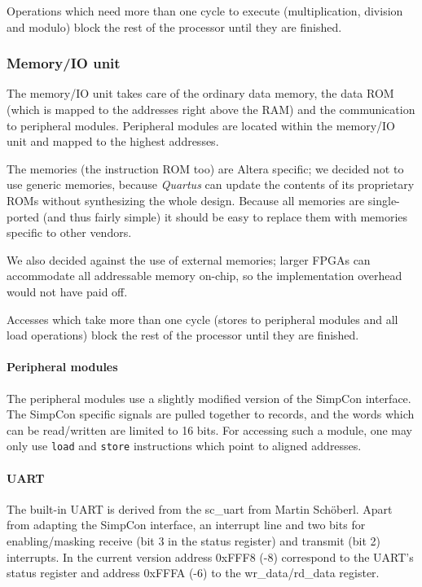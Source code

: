 \documentclass[10pt, twoside, a4paper]{article}
\begin{document}
  Operations which need more than one cycle to execute (multiplication,
  division and modulo) block the rest of the processor until they are
  finished.

  \subsubsection{Memory/IO unit}
  The memory/IO unit takes care of the ordinary data memory, the data
  ROM (which is mapped to the addresses right above the RAM) and the
  communication to peripheral modules. Peripheral modules are located
  within the memory/IO unit and mapped to the highest addresses.

  The memories (the instruction ROM too) are Altera specific; we
  decided not to use generic memories, because \textsl{Quartus} can update the
  contents of its proprietary ROMs without synthesizing the whole
  design. Because all memories are single-ported (and thus fairly
  simple) it should be easy to replace them with memories specific to
  other vendors.

  We also decided against the use of external memories; larger FPGAs
  can accommodate all addressable memory on-chip, so the implementation
  overhead would not have paid off.

  Accesses which take more than one cycle (stores to peripheral
  modules and all load operations) block the rest of the processor
  until they are finished.

  \paragraph{Peripheral modules}
  The peripheral modules use a slightly modified version of the SimpCon
  interface. The SimpCon specific signals are pulled together to
  records, and the words which can be read/written are limited to 16
  bits. For accessing such a module, one may only use \texttt{load}
  and \texttt{store} instructions which point to aligned addresses.

  \paragraph{UART}
  The built-in UART is derived from the sc\_uart from Martin
  Sch\"oberl.  Apart from adapting the SimpCon interface, an interrupt
  line and two bits for enabling/masking receive (bit 3 in the status
  register) and transmit (bit 2) interrupts. In the current version
  address 0xFFF8 (-8) correspond to the UART's status register and
  address 0xFFFA (-6) to the wr\_data/rd\_data register.
\end{document}
